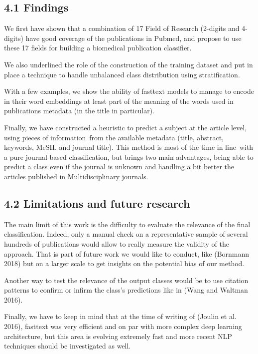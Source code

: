 \documentclass[
]{article}
\begin{document}
\hypertarget{findings}{%
\subsection{4.1 Findings}\label{findings}}

We first have shown that a combination of 17 Field of Research (2-digits
and 4-digits) have good coverage of the publications in Pubmed, and
propose to use these 17 fields for building a biomedical publication
classifier.

We also underlined the role of the construction of the training dataset
and put in place a technique to handle unbalanced class distribution
using stratification.

With a few examples, we show the ability of fasttext models to manage to
encode in their word embeddings at least part of the meaning of the
words used in publications metadata (in the title in particular).

Finally, we have constructed a heuristic to predict a subject at the
article level, using pieces of information~from the available metadata
(title, abstract, keywords, MeSH, and journal title). This method is
most of the time in line~with a pure journal-based classification, but
brings two main advantages, being able to predict a class even if the
journal is unknown and handling a bit better the articles published in
Multidisciplinary journals.

\hypertarget{limitations-and-future-research}{%
\subsection{4.2 Limitations and future
research}\label{limitations-and-future-research}}

The main limit of this work is the difficulty to evaluate the relevance
of the final classification. Indeed, only a manual check on a
representative sample of several hundreds of publications would allow to
really measure the validity of the approach. That is part of future work
we would like to conduct, like (Bornmann 2018) but on a larger scale to
get insights on the potential bias of our method.

Another way to test the relevance of the output classes would be to use
citation patterns to confirm or infirm the class's predictions like in
(Wang and Waltman 2016).

Finally, we have to keep in mind that at the time of writing of (Joulin
et al. 2016), fasttext was very efficient and on par with more complex
deep learning architecture, but this area is evolving extremely fast and
more recent NLP techniques should be investigated as well.
\end{document}
